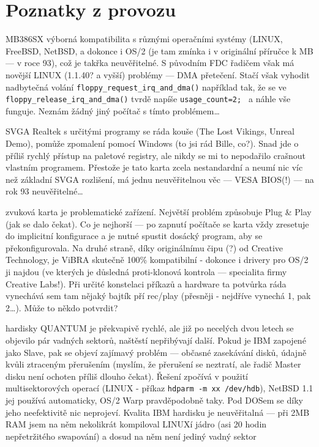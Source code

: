 \section{Poznatky z provozu}
\hangpar MB386SX\cr
 výborná kompatibilita s různými operačními systémy (LINUX, FreeBSD, NetBSD,
 a dokonce i OS/2 (je tam zmínka i v originální příručce k MB --- v roce 93),
 což je takřka neuvěřitelné. S původním FDC řadičem však
 má novější LINUX (1.1.40? a vyšší) problémy --- DMA přetečení. Stačí však
 vyhodit nadbytečná volání {\tt floppy\_request\_irq\_and\_dma()} například tak,
 že se ve
 {\tt floppy\_release\_irq\_and\_dma()} tvrdě napíše {\tt usage\_count=2; } a
 náhle vše funguje. Neznám žádný jiný počítač s tímto problémem\dots
 
\hangpar SVGA Realtek\cr
 s určitými programy se ráda kouše (The Lost Vikings, Unreal Demo), pomůže
 zpomalení pomocí Windows (to jsi rád Bille, co?). Snad
 jde o příliš rychlý přístup na paletové registry, ale nikdy se mi to
 nepodařilo crašnout vlastním programem.
 Přestože je tato karta
 zcela nestandardní a neumí nic víc než základní SVGA rozlišení, má jednu
 neuvěřitelnou věc --- VESA BIOS(!) --- na rok 93 neuvěřitelné\dots
 
\hangpar zvuková karta\cr
 je problematické zařízení. Největší problém způsobuje Plug \& Play (jak se
 dalo čekat). Co je nejhorší --- po zapnutí počítače se karta vždy zresetuje
 do implicitní konfigurace a je nutné spustit dosácký program, aby se
 překonfigurovala. Na druhé straně, díky originálnímu čipu (?) od Creative
 Technology, je ViBRA skutečně 100\% kompatibilní - dokonce i drivery pro
 OS/2 ji najdou (ve kterých je důsledná proti-klonová kontrola --- specialita
 firmy Creative Labs!). Při určité konstelaci příkazů a hardware ta potvůrka
 ráda vynechává sem tam nějaký bajtík pří rec/play (přesněji - nejdříve
 vynechá 1, pak 2\dots). Může to někdo potvrdit?

\hangpar hardisky\cr
 QUANTUM je překvapivě rychlé, ale již po necelých dvou letech se objevilo
 pár vadných sektorů, naštěstí nepřibývají další. Pokud je IBM zapojené jako
 Slave, pak se objeví zajímavý problém --- občasné zasekávání disků, údajně
 kvůli ztraceným přerušením (myslím, že přerušení se neztratí, ale řadič
 Master disku není ochoten příliš dlouho čekat). Řešení zpočívá v použití
 multisektorových operací (LINUX - příkaz {\tt hdparm -m xx /dev/hdb}),
 NetBSD 1.1 jej používá automaticky, OS/2 Warp pravděpodobně taky. Pod DOSem
 se díky jeho neefektivitě nic neprojeví. Kvalita IBM hardisku je
 neuvěřitalná --- při 2MB RAM jsem na něm nekolikrát kompiloval LINUXí jádro
 (asi 20 hodin nepřetržitého swapování) a dosud na něm není jediný vadný
 sektor

